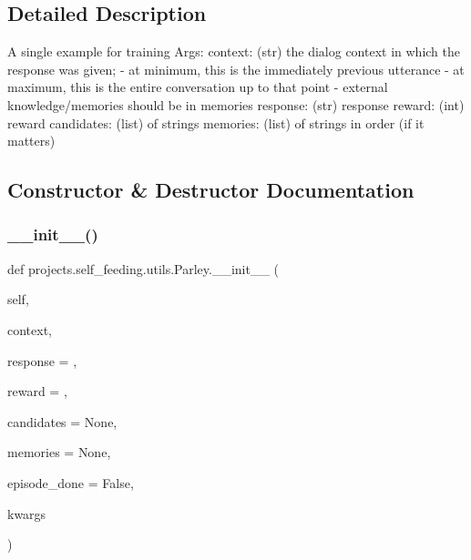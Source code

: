 \subsection{Detailed Description}
\begin{DoxyVerb}A single example for training
Args:
    context: (str) the dialog context in which the response was given;
        - at minimum, this is the immediately previous utterance
        - at maximum, this is the entire conversation up to that point
        - external knowledge/memories should be in memories
    response: (str) response
    reward: (int) reward
    candidates: (list) of strings
    memories: (list) of strings in order (if it matters)
\end{DoxyVerb}
 

\subsection{Constructor \& Destructor Documentation}
\mbox{\label{classprojects_1_1self__feeding_1_1utils_1_1Parley_a6b92aa6bd0af5dd096ae189408b3ad77}} 
\subsubsection{\texorpdfstring{\+\_\+\+\_\+init\+\_\+\+\_\+()}{\_\_init\_\_()}}
{\footnotesize\ttfamily def projects.\+self\+\_\+feeding.\+utils.\+Parley.\+\_\+\+\_\+init\+\_\+\+\_\+ (\begin{DoxyParamCaption}\item[{}]{self,  }\item[{}]{context,  }\item[{}]{response = {\ttfamily \textquotesingle{}\textquotesingle{}},  }\item[{}]{reward = {},  }\item[{}]{candidates = {\ttfamily None},  }\item[{}]{memories = {\ttfamily None},  }\item[{}]{episode\+\_\+done = {\ttfamily False},  }\item[{}]{kwargs }\end{DoxyParamCaption})}



